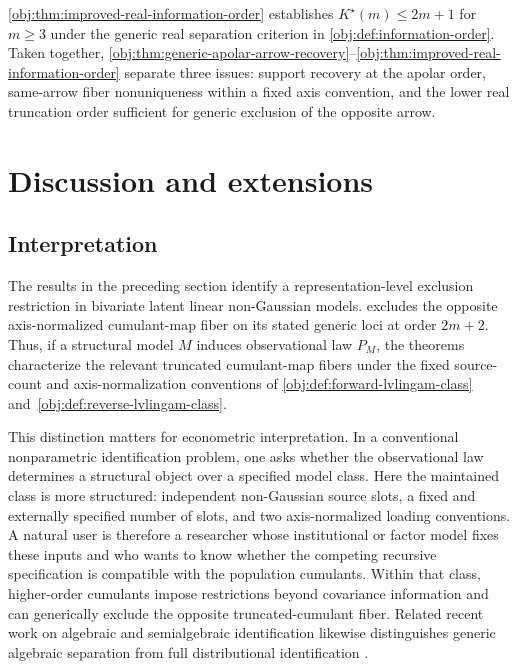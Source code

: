 \documentclass[11pt]{article}
\begin{document}
\cref{obj:thm:improved-real-information-order} establishes \(K^\star(m)\le 2m+1\) for \(m\ge3\) under the generic real separation criterion in \cref{obj:def:information-order}. Taken together, \cref{obj:thm:generic-apolar-arrow-recovery}--\cref{obj:thm:improved-real-information-order} separate three issues: support recovery at the apolar order, same-arrow fiber nonuniqueness within a fixed axis convention, and the lower real truncation order sufficient for generic exclusion of the opposite arrow.


\section{Discussion and extensions}

\subsection{Interpretation}

The results in the preceding section identify a representation-level exclusion restriction in bivariate latent linear non-Gaussian models.  excludes the opposite axis-normalized cumulant-map fiber on its stated generic loci at order \(2m+2\). Thus, if a structural model \(M\) induces observational law \(P_M\), the theorems characterize the relevant truncated cumulant-map fibers under the fixed source-count and axis-normalization conventions of \cref{obj:def:forward-lvlingam-class} and~\cref{obj:def:reverse-lvlingam-class}.

This distinction matters for econometric interpretation. In a conventional nonparametric identification problem, one asks whether the observational law determines a structural object over a specified model class. Here the maintained class is more structured: independent non-Gaussian source slots, a fixed and externally specified number of slots, and two axis-normalized loading conventions. A natural user is therefore a researcher whose institutional or factor model fixes these inputs and who wants to know whether the competing recursive specification is compatible with the population cumulants. Within that class, higher-order cumulants impose restrictions beyond covariance information and can generically exclude the opposite truncated-cumulant fiber. Related recent work on algebraic and semialgebraic identification likewise distinguishes generic algebraic separation from full distributional identification \citep{MestersZwiernik2022,Virolainen2024}.
\end{document}
